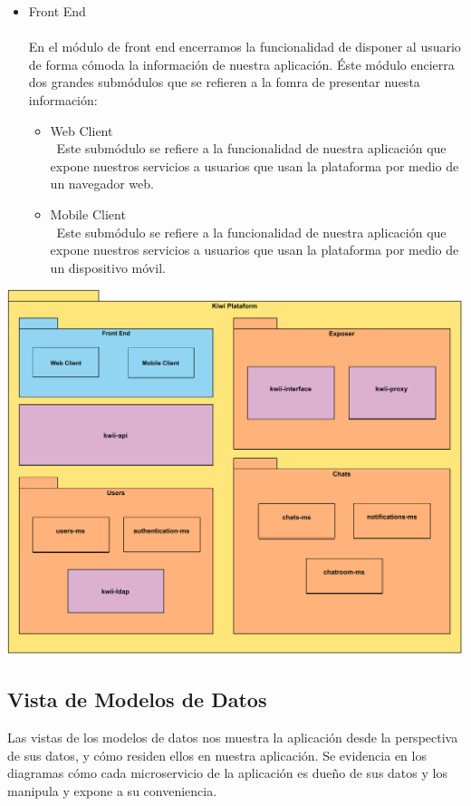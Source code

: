 \begin{itemize}
    \item Front End\\\\
    En el módulo de front end encerramos la funcionalidad de disponer al usuario de forma cómoda la información de nuestra aplicación. Éste módulo encierra dos grandes submódulos que se refieren a la fomra de presentar nuesta información:
    \begin{itemize}
        \item Web Client\\\
        Este submódulo se refiere a la funcionalidad de nuestra aplicación que expone nuestros servicios a usuarios que usan la plataforma por medio de un navegador web. 
        \item Mobile Client\\\
        Este submódulo se refiere a la funcionalidad de nuestra aplicación que expone nuestros servicios a usuarios que usan la plataforma por medio de un dispositivo móvil. 
    \end{itemize}
\end{itemize}

\begin{center}
    \includegraphics[width=16cm]{Figures/P3/Decomposition.png}  
\end{center}

\subsection{Vista de Modelos de Datos}
Las vistas de los modelos de datos nos muestra la aplicación desde la perspectiva de sus datos, y cómo residen ellos en nuestra aplicación. Se evidencia en los diagramas cómo cada microservicio de la aplicación es dueño de sus datos y los manipula y expone a su conveniencia.
